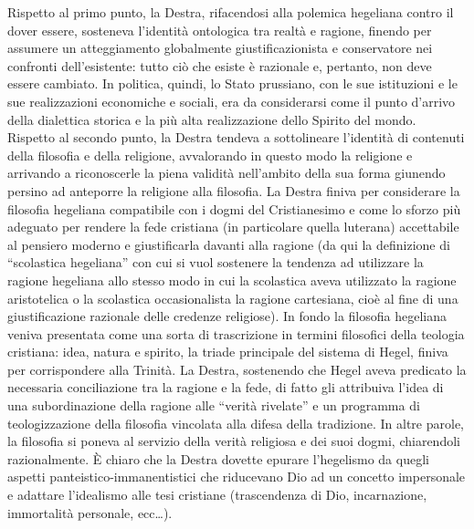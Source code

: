 \documentclass[a4paper,12pt,oneside,openany]{book}%
\begin{document}
Rispetto al primo punto, la Destra, rifacendosi alla polemica hegeliana contro il dover essere, sosteneva l’identità ontologica tra realtà e ragione, finendo per assumere un atteggiamento globalmente giustificazionista e conservatore nei confronti dell’esistente: tutto ciò che esiste è razionale e, pertanto, non deve essere cambiato. In politica, quindi, lo Stato prussiano, con le sue istituzioni e le sue realizzazioni economiche e sociali, era da considerarsi come il punto d’arrivo della dialettica storica e la più alta realizzazione dello Spirito del mondo. Rispetto al secondo punto, la Destra tendeva a sottolineare l’identità di contenuti della filosofia e della religione, avvalorando in questo modo la religione e arrivando a riconoscerle la piena validità nell’ambito della sua forma giunendo persino ad anteporre la religione alla filosofia. La Destra finiva per considerare la filosofia hegeliana compatibile con i dogmi del Cristianesimo e come lo sforzo più adeguato per rendere la fede cristiana (in particolare quella luterana) accettabile al pensiero moderno e giustificarla davanti alla ragione (da qui la definizione di “scolastica hegeliana” con cui si vuol sostenere la tendenza ad utilizzare la ragione hegeliana allo stesso modo in cui la scolastica aveva utilizzato la ragione aristotelica o la scolastica occasionalista la ragione cartesiana, cioè al fine di una giustificazione razionale delle credenze religiose). In fondo la filosofia hegeliana veniva presentata come una sorta di trascrizione in termini filosofici della teologia cristiana: idea, natura e spirito, la triade principale del sistema di Hegel, finiva per corrispondere alla Trinità. La Destra, sostenendo che Hegel aveva predicato la necessaria conciliazione tra la ragione e la fede, di fatto gli attribuiva l’idea di una subordinazione della ragione alle “verità rivelate” e un programma di teologizzazione della filosofia vincolata alla difesa della tradizione. In altre parole, la filosofia si poneva al servizio della verità religiosa e dei suoi dogmi, chiarendoli razionalmente. È chiaro che la Destra dovette epurare l’hegelismo da quegli aspetti panteistico-immanentistici che riducevano Dio ad un concetto impersonale e adattare l’idealismo alle tesi cristiane (trascendenza di Dio, incarnazione, immortalità personale, ecc…).
\end{document}

